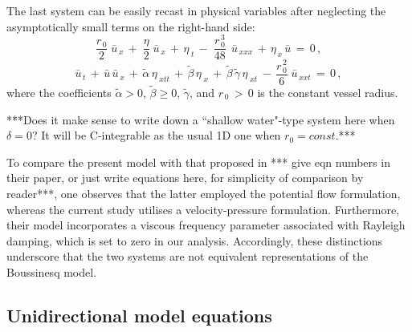 \documentclass[alpha-refs, 12pt]{wiley-article}
\renewcommand{\geq}{\geqslant}
\begin{document}
The last system can be easily recast in physical variables after neglecting the asymptotically small terms on the right-hand side:
\begin{equation}\label{eq:bouss1}
  \frac{r_{\,0}}{2}\;\bar{u}_{\,x}\,+\;\frac{\eta}{2}\;\bar{u}_{\,x}\,+\,\eta_{\;t}\,-\;\frac{r_{\,0}^{\,3}}{48}\,\;\bar{u}_{\,xxx}\,+\,\eta_{\,x}\,\bar{u}\,=\,0\,,
\end{equation}
\begin{equation}\label{eq:bouss2}
  \bar{u}_{\,t}\, + \,\bar{u}\,\bar{u}_{\,x}\, + \,\tilde{\alpha}\,\eta_{\;xtt}\, + \,\tilde{\beta}\,\eta_{\;x}\, + \,\tilde{\beta}\,\tilde{\gamma}\,\eta_{\;xt}\, - \,\frac{r_{\,0}^{\,2}}{6}\;\bar{u}_{\,xxt}\, = \,0\,,
\end{equation}
where the coefficients $\tilde{\alpha}>0$, $\tilde{\beta}\geq 0$, $\tilde{\gamma}$, and $r_{\,0}\,>\,0$ is the constant vessel radius.

{\color{red}***Does it make sense to write down a ``shallow water"-type system here when $\delta=0$? It will be C-integrable as the usual 1D one when $r_0=const$.***}

To compare the present model with that proposed in \cite{Mitsotakis2019} {\color{red}*** give eqn numbers in their paper, or just write equations here, for simplicity of comparison by reader***}, one observes that the latter employed the potential flow formulation, whereas the current study utilises a velocity-pressure formulation. Furthermore, their model incorporates a viscous frequency parameter associated with Rayleigh damping, which is set to zero in our analysis. Accordingly, these distinctions underscore that the two systems are not equivalent representations of the Boussinesq model.

\subsection{Unidirectional model equations}\label{sec:nondim}
\end{document}

